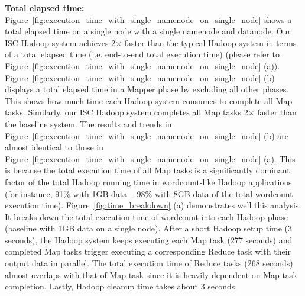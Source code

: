 \textbf{Total elapsed time:} Figure~\ref{fig:execution_time_with_single_namenode_on_single_node} shows a total elapsed time on a single node with a single namenode and datanode. Our ISC Hadoop system achieves 2$\times$ faster than the typical Hadoop system in terms of a total elapsed time (i.e. end-to-end total execution time) (please refer to Figure~\ref{fig:execution_time_with_single_namenode_on_single_node} (a)). Figure~\ref{fig:execution_time_with_single_namenode_on_single_node} (b) displays a total elapsed time in a Mapper phase by excluding all other phases. This shows how much time each Hadoop system consumes to complete all Map tasks. Similarly, our ISC Hadoop system completes all Map tasks 2$\times$ faster than the baseline system. The results and trends in Figure~\ref{fig:execution_time_with_single_namenode_on_single_node} (b) are almost identical to those in Figure~\ref{fig:execution_time_with_single_namenode_on_single_node} (a). This is because the total execution time of all Map tasks is a significantly dominant factor of the total Hadoop running time in wordcount-like Hadoop applications (for instance, 91\% with 1GB data -- 98\% with 8GB data of the total wordcount execution time).
Figure~\ref{fig:time_breakdown} (a) demonstrates well this analysis. It breaks down the total execution time of wordcount into each Hadoop phase (baseline with 1GB data on a single node). After a short Hadoop setup time (3 seconds), the Hadoop system keeps executing each Map task (277 seconds) and completed Map tasks trigger executing a corresponding Reduce task with their output data in parallel. The total execution time of Reduce tasks (268 seconds) almost overlaps with that of Map task since it is heavily dependent on Map task completion. Lastly, Hadoop cleanup time takes about 3 seconds. 






